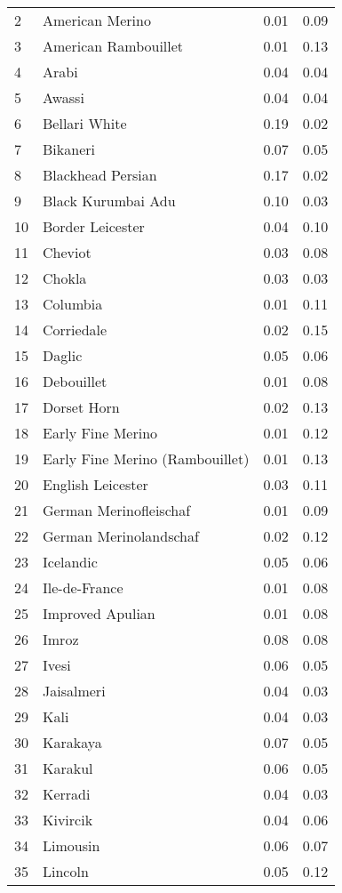 \begin{center}
\begin{longtable}{|p{1.0in}|p{2.0in}|p{1.0in}|p{1.0in}|}
  2 &  American Merino & 0.01 & 0.09 \\ 
  3 &  American Rambouillet & 0.01 & 0.13 \\ 
  4 &  Arabi & 0.04 & 0.04 \\ 
  5 &  Awassi & 0.04 & 0.04 \\ 
  6 &  Bellari White & 0.19 & 0.02 \\ 
  7 &  Bikaneri & 0.07 & 0.05 \\ 
  8 &  Blackhead Persian & 0.17 & 0.02 \\ 
  9 &  Black Kurumbai Adu & 0.10 & 0.03 \\ 
  10 &  Border Leicester & 0.04 & 0.10 \\ 
  11 &  Cheviot & 0.03 & 0.08 \\ 
  12 &  Chokla & 0.03 & 0.03 \\ 
  13 &  Columbia & 0.01 & 0.11 \\ 
  14 &  Corriedale & 0.02 & 0.15 \\ 
  15 &  Daglic & 0.05 & 0.06 \\ 
  16 &  Debouillet & 0.01 & 0.08 \\ 
  17 &  Dorset Horn & 0.02 & 0.13 \\ 
  18 &  Early Fine Merino & 0.01 & 0.12 \\ 
  19 &  Early Fine Merino (Rambouillet) & 0.01 & 0.13 \\ 
  20 &  English Leicester & 0.03 & 0.11 \\ 
  21 &  German Merinofleischaf & 0.01 & 0.09 \\ 
  22 &  German Merinolandschaf & 0.02 & 0.12 \\ 
  23 &  Icelandic & 0.05 & 0.06 \\ 
  24 &  Ile-de-France & 0.01 & 0.08 \\ 
  25 &  Improved Apulian & 0.01 & 0.08 \\ 
  26 &  Imroz & 0.08 & 0.08 \\ 
  27 &  Ivesi & 0.06 & 0.05 \\ 
  28 &  Jaisalmeri & 0.04 & 0.03 \\ 
  29 &  Kali & 0.04 & 0.03 \\ 
  30 &  Karakaya & 0.07 & 0.05 \\ 
  31 &  Karakul & 0.06 & 0.05 \\ 
  32 &  Kerradi & 0.04 & 0.03 \\ 
  33 &  Kivircik & 0.04 & 0.06 \\ 
  34 &  Limousin & 0.06 & 0.07 \\ 
  35 &  Lincoln & 0.05 & 0.12 \\ 

\end{longtable}
\end{center}
